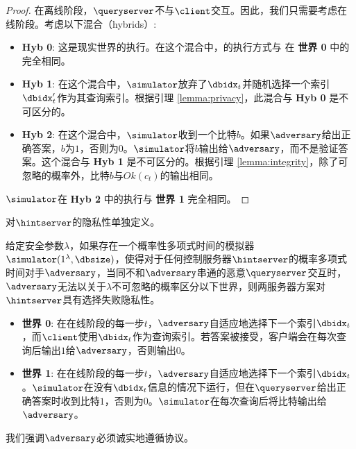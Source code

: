\begin{proof}
    
    在离线阶段，$\queryserver$不与$\client$交互。因此，我们只需要考虑在线阶段。考虑以下混合（hybrids）:
    
    \begin{itemize}
        \item \textbf{Hyb 0}: 这是现实世界的执行。在这个混合中，\simulator 的执行方式与 \client 在 \textbf{世界 0} 中的完全相同。
        \item \textbf{Hyb 1}: 在这个混合中，$\simulator$放弃了$\dbidx_t$并随机选择一个索引$\dbidx_t'$作为其查询索引。根据引理 \ref{lemma:privacy}，此混合与 \textbf{Hyb 0} 是不可区分的。
        \item \textbf{Hyb 2}: 在这个混合中，$\simulator$收到一个比特$b$。如果$\adversary$给出正确答案，$b$为$1$，否则为$0$。$\simulator$将$b$输出给$\adversary$，而不是验证答案。这个混合与 \textbf{Hyb 1} 是不可区分的。根据引理 \ref{lemma:integrity}，除了可忽略的概率外，比特$b$与$Ok(c_t)$的输出相同。
    \end{itemize}
    $\simulator$在 \textbf{Hyb 2} 中的执行与 \textbf{世界 1} 完全相同。
\end{proof}
    
对$\hintserver$的隐私性单独定义。
    
\begin{definition}
    给定安全参数$\lambda$，如果存在一个概率性多项式时间的模拟器$\simulator(1^\lambda, \dbsize)$，使得对于任何控制服务器$\hintserver$的概率多项式时间对手$\adversary$，当同不和$\adversary$串通的恶意$\queryserver$交互时，$\adversary$无法以关于$\lambda$不可忽略的概率区分以下世界，则两服务器方案对$\hintserver$具有选择失败隐私性。
    
    \begin{itemize}
        \item \textbf{世界 0}: 在在线阶段的每一步$t$，$\adversary$自适应地选择下一个索引$\dbidx_t$，而$\client$使用$\dbidx_t$作为查询索引。若答案被接受，客户端会在每次查询后输出$1$给$\adversary$，否则输出$0$。
        \item \textbf{世界 1}: 在在线阶段的每一步$t$，$\adversary$自适应地选择下一个索引$\dbidx_t$。$\simulator$在没有$\dbidx_t$信息的情况下运行，但在$\queryserver$给出正确答案时收到比特$1$，否则为$0$。$\simulator$在每次查询后将比特输出给$\adversary$。
    \end{itemize}
    
    我们强调$\adversary$必须诚实地遵循协议。
\end{definition}
    
